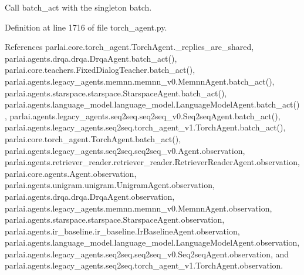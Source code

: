 \begin{DoxyVerb}Call batch_act with the singleton batch.\end{DoxyVerb}
 

Definition at line 1716 of file torch\+\_\+agent.\+py.



References parlai.\+core.\+torch\+\_\+agent.\+Torch\+Agent.\+\_\+replies\+\_\+are\+\_\+shared, parlai.\+agents.\+drqa.\+drqa.\+Drqa\+Agent.\+batch\+\_\+act(), parlai.\+core.\+teachers.\+Fixed\+Dialog\+Teacher.\+batch\+\_\+act(), parlai.\+agents.\+legacy\+\_\+agents.\+memnn.\+memnn\+\_\+v0.\+Memnn\+Agent.\+batch\+\_\+act(), parlai.\+agents.\+starspace.\+starspace.\+Starspace\+Agent.\+batch\+\_\+act(), parlai.\+agents.\+language\+\_\+model.\+language\+\_\+model.\+Language\+Model\+Agent.\+batch\+\_\+act(), parlai.\+agents.\+legacy\+\_\+agents.\+seq2seq.\+seq2seq\+\_\+v0.\+Seq2seq\+Agent.\+batch\+\_\+act(), parlai.\+agents.\+legacy\+\_\+agents.\+seq2seq.\+torch\+\_\+agent\+\_\+v1.\+Torch\+Agent.\+batch\+\_\+act(), parlai.\+core.\+torch\+\_\+agent.\+Torch\+Agent.\+batch\+\_\+act(), parlai.\+agents.\+legacy\+\_\+agents.\+seq2seq.\+seq2seq\+\_\+v0.\+Agent.\+observation, parlai.\+agents.\+retriever\+\_\+reader.\+retriever\+\_\+reader.\+Retriever\+Reader\+Agent.\+observation, parlai.\+core.\+agents.\+Agent.\+observation, parlai.\+agents.\+unigram.\+unigram.\+Unigram\+Agent.\+observation, parlai.\+agents.\+drqa.\+drqa.\+Drqa\+Agent.\+observation, parlai.\+agents.\+legacy\+\_\+agents.\+memnn.\+memnn\+\_\+v0.\+Memnn\+Agent.\+observation, parlai.\+agents.\+starspace.\+starspace.\+Starspace\+Agent.\+observation, parlai.\+agents.\+ir\+\_\+baseline.\+ir\+\_\+baseline.\+Ir\+Baseline\+Agent.\+observation, parlai.\+agents.\+language\+\_\+model.\+language\+\_\+model.\+Language\+Model\+Agent.\+observation, parlai.\+agents.\+legacy\+\_\+agents.\+seq2seq.\+seq2seq\+\_\+v0.\+Seq2seq\+Agent.\+observation, and parlai.\+agents.\+legacy\+\_\+agents.\+seq2seq.\+torch\+\_\+agent\+\_\+v1.\+Torch\+Agent.\+observation.

